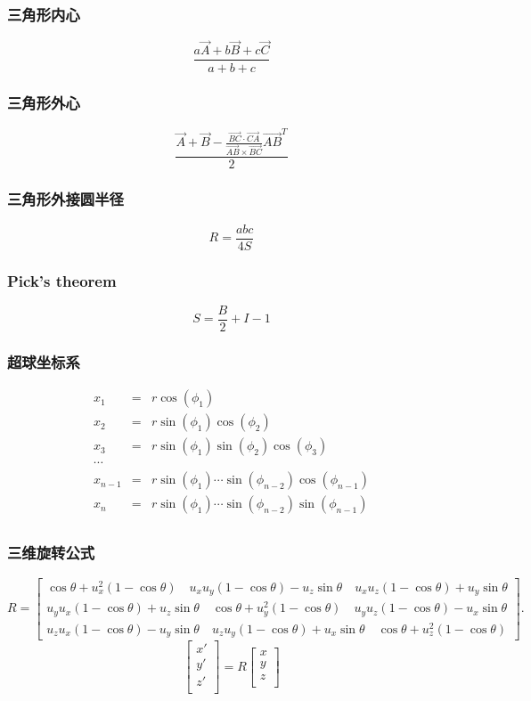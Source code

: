 \subsubsection{三角形内心}
	\[ \frac{a\vec {A} + b\vec{B} + c\vec{C}}{a + b + c} \]
\subsubsection{三角形外心}
	\[ \frac{\vec{A} + \vec{B} - \frac{\overrightarrow {BC} \cdot \overrightarrow{CA}}{\overrightarrow {AB} \times \overrightarrow{BC}}\overrightarrow {AB}^T}{2} \]
\subsubsection{三角形外接圆半径}
	\[ R = \frac{abc}{4S} \]
\subsubsection{Pick's theorem}
	\[ S = \frac{B}{2} + I - 1 \]
\subsubsection{超球坐标系}
\begin{eqnarray*}
 	x_1 &=& r\cos(\phi_1) \\ 
	x_2 &=& r\sin(\phi_1)\cos(\phi_2) \\
	x_3 &=& r\sin(\phi_1)\sin(\phi_2)\cos(\phi_3) \\
	\cdots\\
	x_{n-1} &=& r\sin(\phi_1)\cdots\sin(\phi_{n-2})\cos(\phi_{n-1}) \\
	x_n &=& r\sin(\phi_1)\cdots\sin(\phi_{n-2})\sin(\phi_{n-1}) \\
\end{eqnarray*}
\subsubsection{三维旋转公式}
\[
R = \begin{bmatrix} \cos \theta +u_x^2 \left(1-\cos \theta\right) \quad u_x u_y \left(1-\cos \theta\right) - u_z \sin \theta \quad u_x u_z \left(1-\cos \theta\right) + u_y \sin \theta \\ u_y u_x \left(1-\cos \theta\right) + u_z \sin \theta \quad \cos \theta + u_y^2\left(1-\cos \theta\right) \quad u_y u_z \left(1-\cos \theta\right) - u_x \sin \theta \\ u_z u_x \left(1-\cos \theta\right) - u_y \sin \theta \quad u_z u_y \left(1-\cos \theta\right) + u_x \sin \theta \quad \cos \theta + u_z^2\left(1-\cos \theta\right) 
\end{bmatrix}.
\]
\[
\begin{bmatrix}
x' \\
y' \\
z' \\
\end{bmatrix} = R
\begin{bmatrix}
x \\
y \\
z \\
\end{bmatrix}
\]